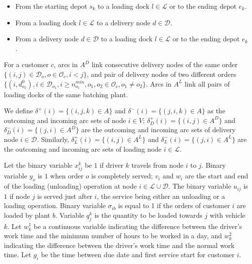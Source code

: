 \documentclass{article}
\begin{document}
\begin{itemize}
    \item From the starting depot $s_k$ to a loading dock $l \in \mathcal{L}$ or to the ending depot $e_k$.
    \item From a loading dock $l \in \mathcal{L}$ to a delivery node $d \in \mathcal{D}$.
    \item From a delivery node  $d \in \mathcal{D}$ to a loading dock $l \in \mathcal{L}$ or to the ending depot $e_k$.
\end{itemize}

For a customer $c$, arcs in $A^D$ link consecutive delivery nodes of the same order   $\lbrace (i,j)\in \mathcal{D}_o, o \in \mathcal{O}_c, i < j  \rbrace$, and pair of delivery nodes of two different orders $ \lbrace (i,d^{0}_{o_2}),  i \in \mathcal{D}_{o_1}, i \geq n^{min}_{o_1}, o_1, o_2 \in \mathcal{O}_c, o_1 \neq o_2 \rbrace $. Arcs in $A^L$ link all pairs of loading docks of the same batching plant.

We define $\delta^{+}(i) = \{(i, j,k) \in A \}$ and $\delta^{-}(i) = \{(j, i,k) \in A \}$ as the outcoming and incoming arc sets of node $i \in V$; $\delta^{+}_D(i) = \{(i, j)  \in A^D\}$ and $\delta^{-}_D(i) = \{(j, i) \in A^D \}$ are the outcoming and incoming arc sets of delivery node $i \in \mathcal{D}$.  Similarly, $\delta^{+}_L(i) = \{(i, j)  \in A^L\}$ and $\delta^{-}_L(i) = \{(j, i) \in A^L \}$ are the outcoming and incoming arc sets of loading node $i \in \mathcal{L}$.

Let the binary variable $x^{k}_{ij}$ be $1$ if driver $k$ travels from node $i$ to $j$. Binary variable $y_o$ is $1$ when order $o$ is completely served; $v_i$ and $w_i$ are the start and end of the loading (unloading) operation at node $i \in \mathcal{L} \cup \mathcal{D}$. The binary variable $u_{ij}$ is $1$ if node $j$ is served just after $i$, the service being either an unloading or a loading operation. Binary variable $\sigma_{ib}$ is equal to 1 if the orders of customer $i$ are loaded by plant $b$. Variable $q^k_j$ is the quantity to be loaded towards $j$ with vehicle $k$. Let $w^1_k$ be a continuous variable indicating the difference between the driver's work time and the minimum number of hours to be worked in a day, and $w^2_k$ indicating the difference between the driver's work time and the normal work time. Let $g_i$ be the time between due date and first service start for customer $i$.
\end{document}
